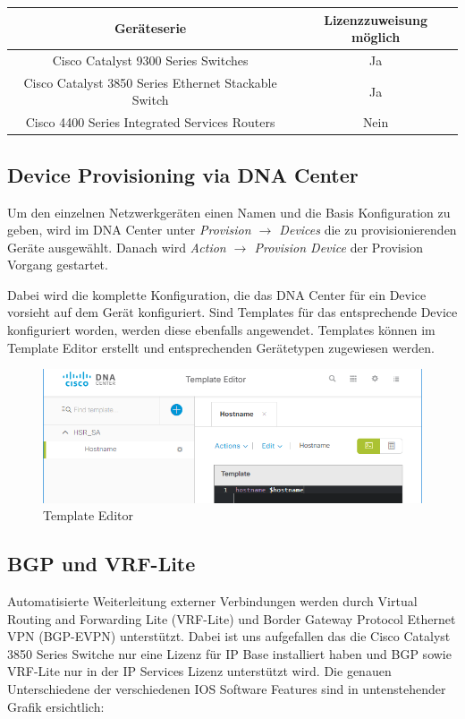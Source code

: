 \begin{tabular}{ | c | c | }
	\hline
	\textbf{Geräteserie} & 	\textbf{Lizenzzuweisung möglich} \\
	\hline
	Cisco Catalyst 9300 Series Switches & Ja \\
	Cisco Catalyst 3850 Series Ethernet Stackable Switch & Ja \\
	Cisco 4400 Series Integrated Services Routers & Nein \\
	\hline
\end{tabular}

\subsection{Device Provisioning via DNA Center}
Um den einzelnen Netzwerkgeräten einen Namen und die Basis Konfiguration zu geben, wird im DNA Center unter \textit{Provision $\rightarrow$ Devices} die zu provisionierenden Geräte ausgewählt. Danach wird \textit{Action $\rightarrow$ Provision Device} der Provision Vorgang gestartet.

Dabei wird die komplette Konfiguration, die das DNA Center für ein Device vorsieht auf dem Gerät konfiguriert. Sind Templates für das entsprechende Device konfiguriert worden, werden diese ebenfalls angewendet.
Templates können im Template Editor erstellt und entsprechenden Gerätetypen zugewiesen werden.

\begin{figure}[H]
	\centering
	\includegraphics[width=12cm]{img/templateeditor.png}
	\caption{Template Editor}
	\label{fig:Template Editor}
\end{figure}


\subsection{BGP und VRF-Lite}
Automatisierte Weiterleitung externer Verbindungen werden durch Virtual Routing and Forwarding Lite (VRF-Lite) und Border Gateway Protocol Ethernet VPN (BGP-EVPN) unterstützt. Dabei ist uns aufgefallen das die Cisco Catalyst 3850 Series Switche nur eine Lizenz für IP Base installiert haben und BGP sowie VRF-Lite nur in der IP Services Lizenz unterstützt wird. Die genauen Unterschiedene der verschiedenen IOS Software Features sind in untenstehender Grafik ersichtlich\cite{cisco-3850-faq}:

